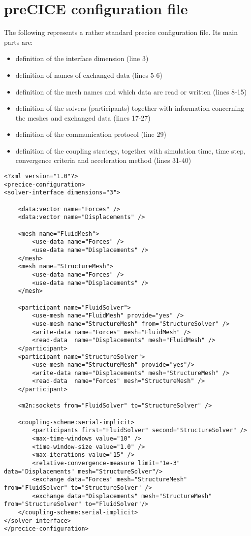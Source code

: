 \chapter{preCICE configuration file}
\label{app:pc-config-file}

The following represents a rather standard \acrshort{precice} configuration file. Its main parts are:

\begin{itemize}
	\item definition of the interface dimension (line 3)
	\item definition of names of exchanged data (lines 5-6)
	\item definition of the mesh names and which data are read or written (lines 8-15)
	\item definition of the solvers (participants) together with information concerning the meshes and exchanged data (lines 17-27)
	\item definition of the communication protocol (line 29)
	\item definition of the coupling strategy, together with simulation time, time step, convergence criteria and acceleration method (lines 31-40)
\end{itemize}

\lstset{language=XML}
\begin{lstlisting}[caption=preCICE configuration file example, label=precice-config]
<?xml version="1.0"?>
<precice-configuration>
<solver-interface dimensions="3">
	
	<data:vector name="Forces" />
	<data:vector name="Displacements" />
	
	<mesh name="FluidMesh">
		<use-data name="Forces" />
		<use-data name="Displacements" />
	</mesh>
	<mesh name="StructureMesh">
		<use-data name="Forces" />
		<use-data name="Displacements" />
	</mesh>
	
	<participant name="FluidSolver">
		<use-mesh name="FluidMesh" provide="yes" />
		<use-mesh name="StructureMesh" from="StructureSolver" />
		<write-data name="Forces" mesh="FluidMesh" />
		<read-data  name="Displacements" mesh="FluidMesh" />
	</participant>
	<participant name="StructureSolver">
		<use-mesh name="StructureMesh" provide="yes"/>
		<write-data name="Displacements" mesh="StructureMesh" />
		<read-data  name="Forces" mesh="StructureMesh" />
	</participant>
	
	<m2n:sockets from="FluidSolver" to="StructureSolver" />

	<coupling-scheme:serial-implicit>
		<participants first="FluidSolver" second="StructureSolver" />
		<max-time-windows value="10" />
		<time-window-size value="1.0" />
		<max-iterations value="15" />
		<relative-convergence-measure limit="1e-3" data="Displacements" mesh="StructureSolver"/>
		<exchange data="Forces" mesh="StructureMesh" from="FluidSolver" to="StructureSolver" />
		<exchange data="Displacements" mesh="StructureMesh" from="StructureSolver" to="FluidSolver"/>
	</coupling-scheme:serial-implicit>
</solver-interface>
</precice-configuration>
\end{lstlisting}





